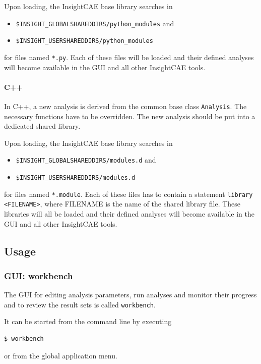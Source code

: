 Upon loading, the InsightCAE base library searches in 
\begin{itemize}
\item \texttt{\$INSIGHT\_GLOBALSHAREDDIRS/python\_modules} and
\item \texttt{\$INSIGHT\_USERSHAREDDIRS/python\_modules}
\end{itemize}  for files named \texttt{*.py}. 
Each of these files will be loaded and their defined analyses will become available in the GUI and all other InsightCAE tools.


\paragraph{C++}

In C++, a new analysis is derived from the common base class \texttt{Analysis}.
The necessary functions have to be overridden.
The new analysis should be put into a dedicated shared library.

Upon loading, the InsightCAE base library searches in 
\begin{itemize}
\item \texttt{\$INSIGHT\_GLOBALSHAREDDIRS/modules.d} and
\item \texttt{\$INSIGHT\_USERSHAREDDIRS/modules.d}
\end{itemize}
for files named \texttt{*.module}. 
Each of these files has to contain a statement \verb!library <FILENAME>!, where FILENAME is the name of the shared library file. These libraries will all be loaded and their defined analyses will become available in the GUI and all other InsightCAE tools.

\subsection{Usage}

\subsubsection{GUI: workbench}
\label{sec:workbench}

The GUI for editing analysis parameters, run analyses and monitor their progress and to review the result sets is called \texttt{workbench}.

It can be started from the command line by executing
\begin{lstlisting}[language=bash]
$ workbench
\end{lstlisting}
or from the global application menu.


